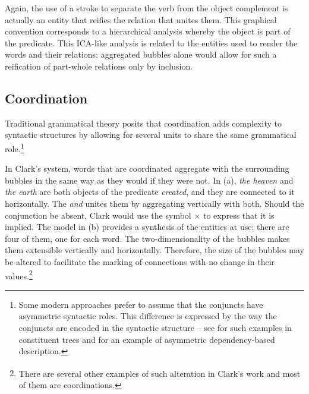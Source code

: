 \documentclass[english,output=paper,colorlinks,citecolor=brown]{../langscibook}
\begin{document}
Again, the use of a stroke to separate the verb from the object complement is actually an entity that reifies the relation that unites them. This graphical convention corresponds to a hierarchical analysis whereby the object is part of the predicate. This ICA-like analysis is related to the entities used to render the words and their relations: aggregated bubbles alone would allow for such a reification of part-whole relations only by inclusion.

\subsection{Coordination}\label{sec:4:4.2}
\largerpage
Traditional grammatical theory posits that coordination adds complexity to syntactic structures by allowing for several units to share the same grammatical role.\footnote{\textrm{Some modern approaches prefer to assume that the conjuncts have asymmetric syntactic roles. This difference is expressed by the way the conjuncts are encoded in the syntactic structure – see \citet{Mouret2007} for such examples in constituent trees and \citet[50--51]{PolguereMeltschuk2009} for an example of asymmetric dependency-based description.}} 



In Clark’s system, words that are coordinated aggregate with the surrounding bubbles in the same way as they would if they were not. In (a), \textit{the heaven} and \textit{the earth} are both objects of the predicate \textit{created}, and they are connected to it horizontally. The  \textit{and} unites them by aggregating vertically with both. Should the conjunction be absent, Clark would use the symbol × to express that it is implied. The model in (b) provides a synthesis of the entities at use: there are four of them, one for each word. The two-dimensionality of the bubbles makes them extensible vertically and horizontally. Therefore, the size of the bubbles may be altered to facilitate the marking of connections with no change in their values.\footnote{\textrm{\textsuperscript{} }\textrm{There are several other examples of such alteration in Clark’s work and most of them are coordinations.} }

\clearpage
\end{document}
